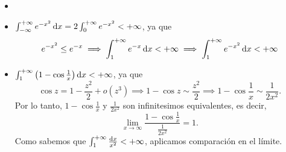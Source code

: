 \begin{example}
    \begin{itemize}
        \item[]
        \item $\int^{+\infty}_{-\infty} e^{-x^2} \dif x = 2
                \int^{+\infty}_0 e^{-x^2} < +\infty$, ya que 
            \[
                e^{-x^2} \leq e^{-x} \implies \int^{+\infty}_1 e^{-x}
                \dif x < +\infty \implies \int^{+\infty}_1 e^{-x^2}
                \dif x < +\infty
            \]
        \item $\int^{+\infty}_1 \left( 1 - \cos \frac{1}{x} \right)
                \dif x < +\infty$, ya que
            \[
                \cos z = 1 - \frac{z^2}{2} + o(z^3) \implies
                1-\cos z \sim \frac{z^2}{2} \implies
                1-\cos \frac{1}{x} \sim \frac{1}{2x^2}.
            \]
            Por lo tanto, $1-\cos \frac{1}{x}$ y $\frac{1}{2x^2}$ son 
            infinitesimos equivalentes, es decir,
            \[
                \lim_{x \to \infty} \frac{1-\cos \frac{1}{x}}
                {\frac{1}{2x^2}} = 1.
            \]
            Como sabemos que $\huge\int^{+\infty}_1 \frac{\dif x}{x^2} <
            +\infty$, aplicamos comparación en el límite.
    \end{itemize}
\end{example}

